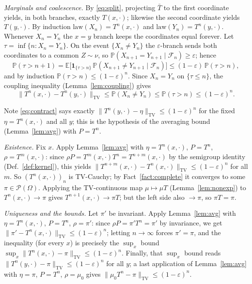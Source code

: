 \documentclass[11pt]{article}
\makeatletter
\theoremstyle{definitionbreak}
\theoremstyle{plainbreak}
\theoremstyle{remarkbreak}
\renewenvironment{proof}[1][\proofname]{\par
  \pushQED{\qed}\normalfont
  \topsep6\p@\@plus6\p@\relax
  \trivlist
  \item[\hskip\labelsep\itshape #1\@addpunct{.}]\mbox{}\par\nobreak\ignorespaces
}{\popQED\endtrivlist\@endpefalse}
\newcommand{\E}{\mathbb{E}}
\newcommand{\Prob}{\mathbb{P}}
\newcommand{\cP}{\mathcal{P}}
\newcommand{\Om}{\Omega}
\newcommand{\TV}{\mathrm{TV}}
\newcommand{\norm}[1]{\lVert #1 \rVert}
\makeatother
\begin{document}
\begin{proof}
\emph{Marginals and coalescence.} By \eqref{eq:split}, projecting $\bar T$ to the first coordinate
yields, in both branches, exactly $T(x,\cdot)$; likewise the second coordinate yields $T(y,\cdot)$.
By induction $\mathrm{law}(X_n)=T^n(x,\cdot)$ and $\mathrm{law}(Y_n)=T^n(y,\cdot)$. Whenever
$X_n=Y_n$ the $x=y$ branch keeps the coordinates equal forever. Let $\tau=\inf\{n:X_n=Y_n\}$. On the
event $\{X_n\neq Y_n\}$ the $\varepsilon$-branch sends both coordinates to a common $Z\sim\nu$, so
$\Prob(X_{n+1}=Y_{n+1}\mid\mathcal F_n)\ge\varepsilon$; hence
\[
  \Prob(\tau>n+1)=\E\big[\mathbf 1_{\{\tau>n\}}\,\Prob(X_{n+1}\neq Y_{n+1}\mid\mathcal F_n)\big]
  \le(1-\varepsilon)\,\Prob(\tau>n),
\]
and by induction $\Prob(\tau>n)\le(1-\varepsilon)^n$. Since $X_n=Y_n$ on $\{\tau\le n\}$, the
coupling inequality (Lemma~\ref{lem:coupling}) gives
\begin{equation}\label{eq:contract}
  \norm{T^n(x,\cdot)-T^n(y,\cdot)}_\TV\le\Prob(X_n\neq Y_n)\le\Prob(\tau>n)\le(1-\varepsilon)^n .
\end{equation}

Note \eqref{eq:contract} says exactly $\norm{T^n(y,\cdot)-\eta}_\TV\le(1-\varepsilon)^n$ for the fixed
$\eta=T^n(x,\cdot)$ and all $y$; this is the hypothesis of the averaging bound
(Lemma~\ref{lem:avg}) with $P=T^n$.

\emph{Existence.} Fix $x$. Apply Lemma~\ref{lem:avg} with $\eta=T^n(x,\cdot)$, $P=T^n$,
$\rho=T^m(x,\cdot)$: since $\rho P=T^m(x,\cdot)T^n=T^{n+m}(x,\cdot)$ by the semigroup identity
(Def.~\ref{def:kernel}), this yields $\norm{T^{n+m}(x,\cdot)-T^n(x,\cdot)}_\TV\le(1-\varepsilon)^n$
for all $m$. So $(T^n(x,\cdot))_n$ is $\TV$-Cauchy; by Fact~\ref{fact:complete} it converges to some
$\pi\in\cP(\Om)$. Applying the $\TV$-continuous map $\mu\mapsto\mu T$ (Lemma~\ref{lem:nonexp}) to
$T^{n}(x,\cdot)\to\pi$ gives $T^{n+1}(x,\cdot)\to\pi T$; but the left side also $\to\pi$, so
$\pi T=\pi$.

\emph{Uniqueness and the bounds.} Let $\pi'$ be invariant. Apply Lemma~\ref{lem:avg} with
$\eta=T^n(x,\cdot)$, $P=T^n$, $\rho=\pi'$: since $\rho P=\pi'T^n=\pi'$ by invariance, we get
$\norm{\pi'-T^n(x,\cdot)}_\TV\le(1-\varepsilon)^n$; letting $n\to\infty$ forces $\pi'=\pi$, and the
inequality (for every $x$) is precisely the $\sup_x$ bound $\sup_x\norm{T^n(x,\cdot)-\pi}_\TV\le(1-\varepsilon)^n$.
Finally, that $\sup_x$ bound reads $\norm{T^n(y,\cdot)-\pi}_\TV\le(1-\varepsilon)^n$ for all $y$; a last
application of Lemma~\ref{lem:avg} with $\eta=\pi$, $P=T^n$, $\rho=\mu_0$ gives
$\norm{\mu_0T^n-\pi}_\TV\le(1-\varepsilon)^n$.
\end{proof}
\end{document}
